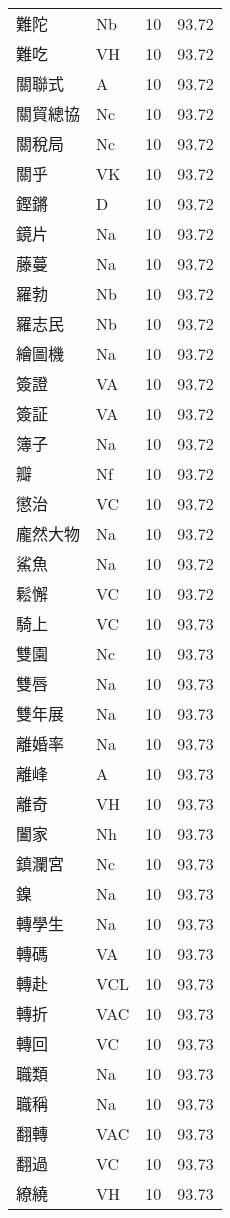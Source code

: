 \documentclass[twocolumn]{book}
\begin{document}
\begin{supertabular}{llrr}
難陀 & Nb & 10 &  93.72\\
難吃 & VH & 10 &  93.72\\
關聯式 & A & 10 &  93.72\\
關貿總協 & Nc & 10 &  93.72\\
關稅局 & Nc & 10 &  93.72\\
關乎 & VK & 10 &  93.72\\
鏗鏘 & D & 10 &  93.72\\
鏡片 & Na & 10 &  93.72\\
藤蔓 & Na & 10 &  93.72\\
羅勃 & Nb & 10 &  93.72\\
羅志民 & Nb & 10 &  93.72\\
繪圖機 & Na & 10 &  93.72\\
簽證 & VA & 10 &  93.72\\
簽証 & VA & 10 &  93.72\\
簿子 & Na & 10 &  93.72\\
瓣 & Nf & 10 &  93.72\\
懲治 & VC & 10 &  93.72\\
龐然大物 & Na & 10 &  93.72\\
鯊魚 & Na & 10 &  93.72\\
鬆懈 & VC & 10 &  93.72\\
騎上 & VC & 10 &  93.73\\
雙園 & Nc & 10 &  93.73\\
雙唇 & Na & 10 &  93.73\\
雙年展 & Na & 10 &  93.73\\
離婚率 & Na & 10 &  93.73\\
離峰 & A & 10 &  93.73\\
離奇 & VH & 10 &  93.73\\
闔家 & Nh & 10 &  93.73\\
鎮瀾宮 & Nc & 10 &  93.73\\
鎳 & Na & 10 &  93.73\\
轉學生 & Na & 10 &  93.73\\
轉碼 & VA & 10 &  93.73\\
轉赴 & VCL & 10 &  93.73\\
轉折 & VAC & 10 &  93.73\\
轉回 & VC & 10 &  93.73\\
職類 & Na & 10 &  93.73\\
職稱 & Na & 10 &  93.73\\
翻轉 & VAC & 10 &  93.73\\
翻過 & VC & 10 &  93.73\\
繚繞 & VH & 10 &  93.73\\

\end{supertabular}
\end{document}
